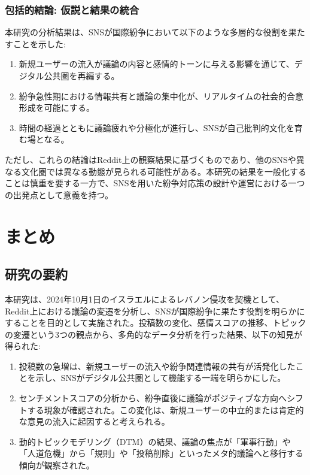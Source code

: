 \documentclass[11pt, a4j]{jreport}
\begin{document}
    \subsection{包括的結論: 仮説と結果の統合}
    本研究の分析結果は、SNSが国際紛争において以下のような多層的な役割を果たすことを示した:
    \begin{enumerate}
        \item 新規ユーザーの流入が議論の内容と感情的トーンに与える影響を通じて、デジタル公共圏を再編する。
        \item 紛争急性期における情報共有と議論の集中化が、リアルタイムの社会的合意形成を可能にする。
        \item 時間の経過とともに議論疲れや分極化が進行し、SNSが自己批判的文化を育む場となる。
    \end{enumerate}

    ただし、これらの結論はReddit上の観察結果に基づくものであり、他のSNSや異なる文化圏では異なる動態が見られる可能性がある。本研究の結果を一般化することは慎重を要する一方で、SNSを用いた紛争対応策の設計や運営における一つの出発点として意義を持つ。

    \chapter{まとめ}

    \section{研究の要約}
    本研究は、2024年10月1日のイスラエルによるレバノン侵攻を契機として、Reddit上における議論の変遷を分析し、SNSが国際紛争に果たす役割を明らかにすることを目的として実施された。投稿数の変化、感情スコアの推移、トピックの変遷という3つの観点から、多角的なデータ分析を行った結果、以下の知見が得られた:

    \begin{enumerate}
        \item 投稿数の急増は、新規ユーザーの流入や紛争関連情報の共有が活発化したことを示し、SNSがデジタル公共圏として機能する一端を明らかにした。
        \item センチメントスコアの分析から、紛争直後に議論がポジティブな方向へシフトする現象が確認された。この変化は、新規ユーザーの中立的または肯定的な意見の流入に起因すると考えられる。
        \item 動的トピックモデリング（DTM）の結果、議論の焦点が「軍事行動」や「人道危機」から「規則」や「投稿削除」といったメタ的議論へと移行する傾向が観察された。
    \end{enumerate}
\end{document}
